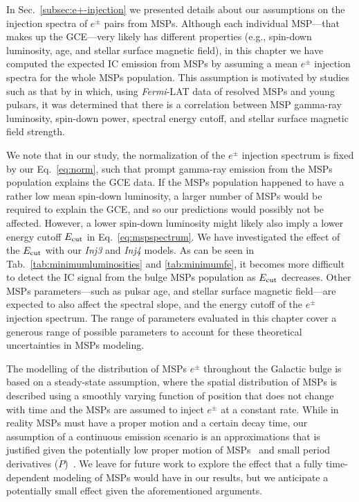 \documentclass[doublespace,nopageskip]{VTthesis}
\begin{document}
In Sec.~\ref{subsec:e+-injection} we presented details about our assumptions on the injection spectra of $e^\pm$ pairs from MSPs. Although each individual MSP---that makes up the GCE---very likely has different properties (e.g., spin-down luminosity, age, and stellar surface magnetic field), in this chapter we have computed the expected IC emission from MSPs by assuming a mean $e^\pm$ injection spectra for the whole MSPs population. This assumption is motivated by studies such as that by \citet{2019ApJ...883L...4K} in which, using \textit{Fermi}-LAT data of resolved MSPs and young pulsars, it was determined that there is a correlation between MSP gamma-ray luminosity, spin-down power, spectral energy cutoff, and stellar surface magnetic field strength.  

We note that in our study, the normalization of the $e^\pm$ injection spectrum is fixed by our Eq.~\ref{eq:norm}, such that prompt gamma-ray emission from the MSPs population explains the GCE data. If the MSPs population happened to have a rather low mean spin-down luminosity, a larger number of MSPs would be required to explain the GCE, and so our predictions would possibly not be affected. However, a lower spin-down luminosity might likely also imply a lower energy cutoff $E_{\rm cut}$ in Eq.~\ref{eq:mspspectrum}. We have investigated the effect of the $E_{\rm cut}$ with our \textit{Inj3} and \textit{Inj4} models. As can be seen in Tab.~\ref{tab:minimumluminosities} and \ref{tab:minimumfe}, it becomes more difficult to detect the IC signal from the bulge MSPs population as $E_{\rm cut}$ decreases. Other MSPs parameters---such as pulsar age, and stellar surface magnetic field---are expected to also affect the spectral slope, and the energy cutoff of the $e^\pm$ injection spectrum. The range of parameters evaluated in this chapter cover a generous range of possible parameters to account for these theoretical uncertainties in MSPs modeling.

The modelling of the distribution of MSPs $e^\pm$ throughout the Galactic bulge is based on a steady-state assumption, where the spatial distribution of MSPs is described using a smoothly varying function of position that does not change with time and the MSPs are assumed to inject $e^\pm$ at a constant rate. While in reality MSPs must have a proper motion and a certain decay time, our assumption of a continuous emission scenario is an approximations that is justified given the potentially low proper motion of MSPs~\citep{2005MNRAS.360..974H} and small period derivatives ($\dot{P}$)~\citep{2021arXiv210105751H}. We leave for future work to explore the effect that a fully time-dependent modeling of MSPs would have in our results, but we anticipate a potentially small effect given the aforementioned arguments.
\end{document}
